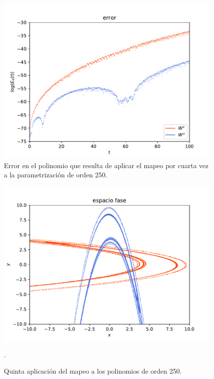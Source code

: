 \begin{figure}[H]
\centering
\includegraphics[scale=0.6]{error4ite}
\caption{Error en el polinomio que resulta de aplicar el mapeo por cuarta vez a la parametrización de orden 250.}
\label{error-4iteracion}
\end{figure}

\begin{figure}[H]
\centering
\includegraphics[scale=0.6]{rectangulo5}
\caption{Quinta aplicación del mapeo a los polinomios de orden 250.}.
\label{Rectangulo5}
\end{figure}

